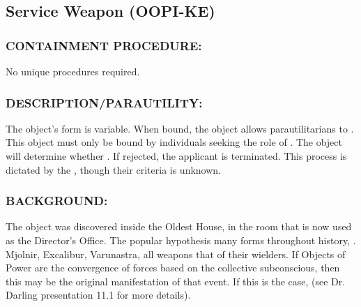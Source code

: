 \subsection*{Service Weapon (OOPI-KE)}
\subsubsection*{CONTAINMENT PROCEDURE:}
\par No unique procedures required.
\subsubsection*{DESCRIPTION/PARAUTILITY:}
The object's form is variable.
When bound, the object allows
parautilitarians to . This object must only be bound by individuals seeking the role of . The object will determine whether . If
rejected, the applicant is terminated. This process is dictated by
the , though their criteria is unknown.
\subsubsection*{BACKGROUND:}
\par The object was discovered inside the Oldest House, in the room
that is now used as the Director's Office. The popular hypothesis  many forms throughout history, . Mjolnir, Excalibur, Varunastra, all weapons that  of their wielders. If Objects of Power are the convergence of
forces based on the collective subconscious, then this may be
the original manifestation of that event. If this is the case,  (see Dr. Darling presentation 11.1 for more
details).